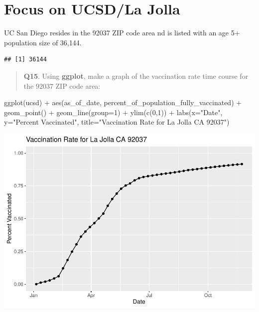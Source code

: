 \documentclass[
]{article}
\newenvironment{Shaded}{\begin{snugshade}}{\end{snugshade}}
\newcommand{\AttributeTok}[1]{\textcolor[rgb]{0.77,0.63,0.00}{#1}}
\newcommand{\DecValTok}[1]{\textcolor[rgb]{0.00,0.00,0.81}{#1}}
\newcommand{\FunctionTok}[1]{\textcolor[rgb]{0.00,0.00,0.00}{#1}}
\newcommand{\NormalTok}[1]{#1}
\newcommand{\OtherTok}[1]{\textcolor[rgb]{0.56,0.35,0.01}{#1}}
\newcommand{\SpecialCharTok}[1]{\textcolor[rgb]{0.00,0.00,0.00}{#1}}
\newcommand{\StringTok}[1]{\textcolor[rgb]{0.31,0.60,0.02}{#1}}
\begin{document}
\hypertarget{focus-on-ucsdla-jolla}{%
\section{Focus on UCSD/La Jolla}\label{focus-on-ucsdla-jolla}}

UC San Diego resides in the 92037 ZIP code area nd is listed with an age
5+ population size of 36,144.

\begin{Shaded}
\end{Shaded}

\begin{verbatim}
## [1] 36144
\end{verbatim}

\begin{quote}
\textbf{Q15}. Using \textbf{ggplot}, make a graph of the vaccination
rate time course for the 92037 ZIP code area:
\end{quote}

\begin{Shaded}
\begin{Highlighting}[]
\FunctionTok{ggplot}\NormalTok{(ucsd) }\SpecialCharTok{+} \FunctionTok{aes}\NormalTok{(as\_of\_date, percent\_of\_population\_fully\_vaccinated) }\SpecialCharTok{+} 
  \FunctionTok{geom\_point}\NormalTok{() }\SpecialCharTok{+} \FunctionTok{geom\_line}\NormalTok{(}\AttributeTok{group=}\DecValTok{1}\NormalTok{) }\SpecialCharTok{+} \FunctionTok{ylim}\NormalTok{(}\FunctionTok{c}\NormalTok{(}\DecValTok{0}\NormalTok{,}\DecValTok{1}\NormalTok{)) }\SpecialCharTok{+}
  \FunctionTok{labs}\NormalTok{(}\AttributeTok{x=}\StringTok{"Date"}\NormalTok{, }\AttributeTok{y=}\StringTok{"Percent Vaccinated"}\NormalTok{, }
       \AttributeTok{title=}\StringTok{"Vaccination Rate for La Jolla CA 92037"}\NormalTok{)}
\end{Highlighting}
\end{Shaded}

\includegraphics{Class17_files/figure-latex/unnamed-chunk-31-1.pdf}
\end{document}

